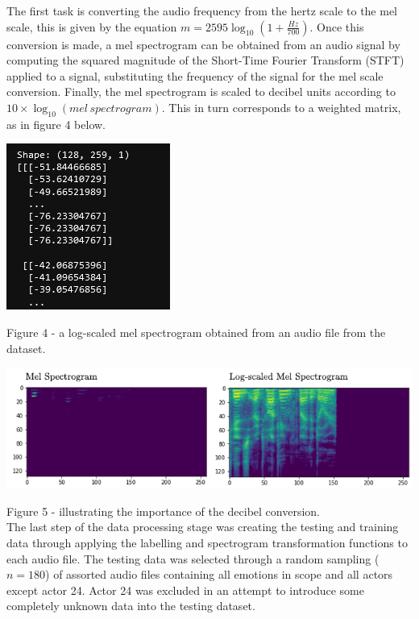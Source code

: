 \documentclass[12pt]{article}
\begin{document}
\noindent The first task is converting the audio frequency from the hertz scale to the mel scale, this is given by the equation $m = 2595 \log_{10}\left(1 + \frac{Hz}{700}\right)$. Once this conversion is made, a mel spectrogram can be obtained from an audio signal by computing the squared magnitude of the Short-Time Fourier Transform (STFT) applied to a signal, substituting the frequency of the signal for the mel scale conversion. Finally, the mel spectrogram is scaled to decibel units according to $10 \times \log_{10}(mel \, spectrogram)$. This in turn corresponds to a weighted matrix, as in figure 4 below.
\\
\begin{center}
\includegraphics{figure_3_spectrogram_matrix}
\end{center}
Figure 4 - a log-scaled mel spectrogram obtained from an audio file from the dataset.
\begin{center}
\includegraphics{figure_5_log_spectrogram}
\end{center}
Figure 5 - illustrating the importance of the decibel conversion.
\\

\noindent The last step of the data processing stage was creating the testing and training data through applying the labelling and spectrogram transformation functions to each audio file. The testing data was selected through a random sampling ($n = 180$) of assorted audio files containing all emotions in scope and all actors except actor 24. Actor 24 was excluded in an attempt to introduce some completely unknown data into the testing dataset.
\newpage
\end{document}
